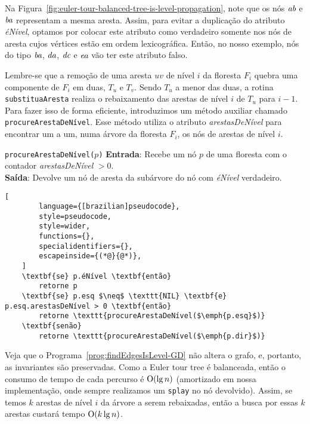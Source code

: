 Na Figura~\ref{fig:euler-tour-balanced-tree-is-level-propagation}, note que os nós $\emph{ab}$ e $\emph{ba}$ representam a mesma aresta. Assim, para evitar a duplicação do atributo \textit{éNível}, optamos por colocar este atributo como verdadeiro somente nos nós de aresta cujos vértices estão em ordem lexicográfica. Então, no nosso exemplo, nós do tipo $\emph{ba}$, $\emph{da}$, $\emph{dc}$ e $\emph{ea}$ vão ter este atributo falso. 

Lembre-se que a remoção de uma aresta $uv$ de nível $i$ da floresta $F_i$ quebra uma componente de $F_i$ em duas, $T_u$ e $T_v$. Sendo $T_u$ a menor das duas, a rotina \texttt{substituaAresta} realiza o rebaixamento das arestas de nível $i$ de $T_u$ para $i-1$. Para fazer isso de forma eficiente, introduzimos um método auxiliar chamado \texttt{procureArestaDeNível}. Esse método utiliza o atributo \textit{arestasDeNível} para encontrar um a um, numa árvore da floresta $F_i$, os nós de arestas de nível $i$.

\begin{programruledcaption}{\texttt{procureArestaDeNível($p$)} \label{prog:findEdgesIsLevel-GD}}
    \noindent\textbf{Entrada}: Recebe um nó $p$ de uma floresta com o contador \textit{arestasDeNível} $> 0$.
    \\
    \noindent\textbf{Saída}: Devolve um nó de aresta da subárvore do nó com \textit{éNível} verdadeiro.
    \vspace{-0.5\baselineskip}
    \begin{lstlisting}[
        language={[brazilian]pseudocode},
        style=pseudocode,
        style=wider,
        functions={},
        specialidentifiers={},
        escapeinside={(*@}{@*)},
    ]
    \textbf{se} p.éNível \textbf{então}
        retorne p
    \textbf{se} p.esq $\neq$ \texttt{NIL} \textbf{e} p.esq.arestasDeNível > 0 \textbf{então}
        retorne \texttt{procureArestaDeNível($\emph{p.esq}$)}
    \textbf{senão}
        retorne \texttt{procureArestaDeNível($\emph{p.dir}$)}
\end{lstlisting}
\vspace{-0.5\baselineskip}
\end{programruledcaption}

Veja que o Programa~\ref{prog:findEdgesIsLevel-GD} não altera o grafo, e, portanto, as invariantes são preservadas. Como a Euler tour tree é balanceada, então o consumo de tempo de cada percurso é $\mathrm{O}(\lg n)$ (amortizado em nossa implementação, onde sempre realizamos um \texttt{splay} no nó devolvido). Assim, se temos $k$ arestas de nível $i$ da árvore a serem rebaixadas, então a busca por essas $k$ arestas custará tempo $\mathrm{O}(k \lg n)$.

